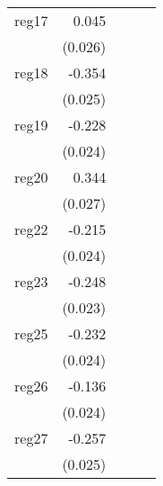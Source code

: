 {\begin{longtable}{l*{4}{D{.}{.}{-1}}}
\addlinespace
reg17       &       0.045         &                     &                     &                     \\
            &     (0.026)         &                     &                     &                     \\
\addlinespace
reg18       &      -0.354\sym{***}&                     &                     &                     \\
            &     (0.025)         &                     &                     &                     \\
\addlinespace
reg19       &      -0.228\sym{***}&                     &                     &                     \\
            &     (0.024)         &                     &                     &                     \\
\addlinespace
reg20       &       0.344\sym{***}&                     &                     &                     \\
            &     (0.027)         &                     &                     &                     \\
\addlinespace
reg22       &      -0.215\sym{***}&                     &                     &                     \\
            &     (0.024)         &                     &                     &                     \\
\addlinespace
reg23       &      -0.248\sym{***}&                     &                     &                     \\
            &     (0.023)         &                     &                     &                     \\
\addlinespace
reg25       &      -0.232\sym{***}&                     &                     &                     \\
            &     (0.024)         &                     &                     &                     \\
\addlinespace
reg26       &      -0.136\sym{***}&                     &                     &                     \\
            &     (0.024)         &                     &                     &                     \\
\addlinespace
reg27       &      -0.257\sym{***}&                     &                     &                     \\
            &     (0.025)         &                     &                     &                     \\

\end{longtable}}
